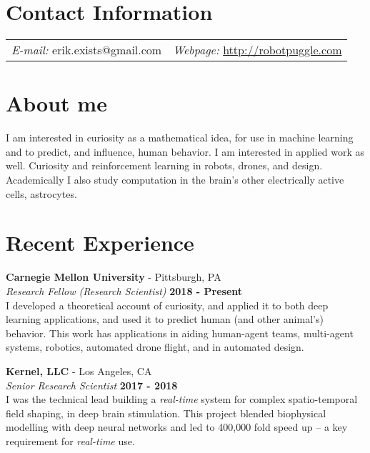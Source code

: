 \documentclass[margin,line]{res}
\begin{document}
\newcommand{\link}[1]{\texttt{#1}}
\providecommand{\tightlist}{%
    \setlength{\itemsep}{0pt}\setlength{\parskip}{0pt}}



\begin{resume}
\section{\sc Contact Information}
\vspace{.05in}

\begin{tabular}{@{}p{2in}p{4in}}
{\it E-mail:}  erik.exists@gmail.com   & {\it Webpage:} \href{http://robotpuggle.com}{http://robotpuggle.com} \\
\end{tabular}

\section{\sc About me}
I am interested in curiosity as a mathematical idea, for use in machine learning and to predict, and influence, human behavior. I am interested in applied work as well. Curiosity and reinforcement learning in robots, drones, and design. Academically I also study computation in the brain’s other electrically active cells, astrocytes. 

\section{\sc Recent Experience}
\vspace{-.1cm}
{\bf Carnegie Mellon University} - Pittsburgh, PA \\
{\em Research Fellow (Research Scientist)} \hfill {\bf 2018 - Present}\\
I developed a theoretical account of curiosity, and applied it to both deep learning applications, and used it to predict human (and other animal's) behavior. This work has applications in aiding human-agent teams, multi-agent systems, robotics, automated drone flight, and in automated design.

\vspace{-.1cm}
{\bf Kernel, LLC} - Los Angeles, CA\\
{\em Senior Research Scientist} \hfill {\bf 2017 - 2018}\\
I was the technical lead building a \emph{real-time} system for complex spatio-temporal field shaping, in deep brain stimulation. This project blended biophysical modelling with deep neural networks and led to 400,000 fold speed up -- a key requirement for \emph{real-time} use.


\end{resume}
\end{document}
